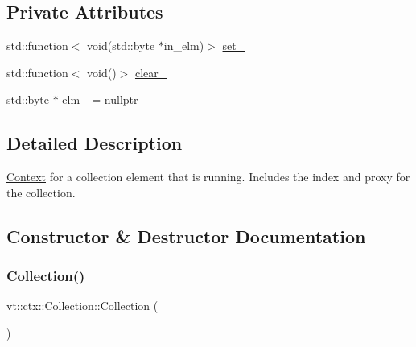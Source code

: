 \subsection*{Private Attributes}
\begin{DoxyCompactItemize}
\item 
std\+::function$<$ void(std\+::byte $\ast$in\+\_\+elm)$>$ \hyperlink{structvt_1_1ctx_1_1_collection_a242e2e37cd83472753ec93d01276ddef}{set\+\_\+}
\item 
std\+::function$<$ void()$>$ \hyperlink{structvt_1_1ctx_1_1_collection_a300d6fb22980dbd23b0cdb8737dc25be}{clear\+\_\+}
\item 
std\+::byte $\ast$ \hyperlink{structvt_1_1ctx_1_1_collection_a4df2b52dcc2ef62a10ac9211e5a479d9}{elm\+\_\+} = nullptr
\end{DoxyCompactItemize}


\subsection{Detailed Description}
\hyperlink{structvt_1_1ctx_1_1_context}{Context} for a collection element that is running. Includes the index and proxy for the collection. 

\subsection{Constructor \& Destructor Documentation}
\mbox{\label{structvt_1_1ctx_1_1_collection_a19c7871680086e92be70f24d58bb0321}} 
\subsubsection{\texorpdfstring{Collection()}{Collection()}\hspace{0.1cm}{\footnotesize\ttfamily [1/2]}}
{\footnotesize\ttfamily vt\+::ctx\+::\+Collection\+::\+Collection (\begin{DoxyParamCaption}{ }\end{DoxyParamCaption})\hspace{0.3cm}{\ttfamily [default]}}

\mbox{\label{structvt_1_1ctx_1_1_collection_a461f8690260111c0dd2f21bd1b3acf6c}} 
